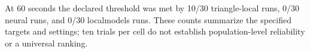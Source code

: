 At 60 seconds the declared threshold was met by 10/30 triangle-local runs, 0/30 neural runs, and 0/30 localmodels runs. These counts summarize the specified targets and settings; ten trials per cell do not establish population-level reliability or a universal ranking.
